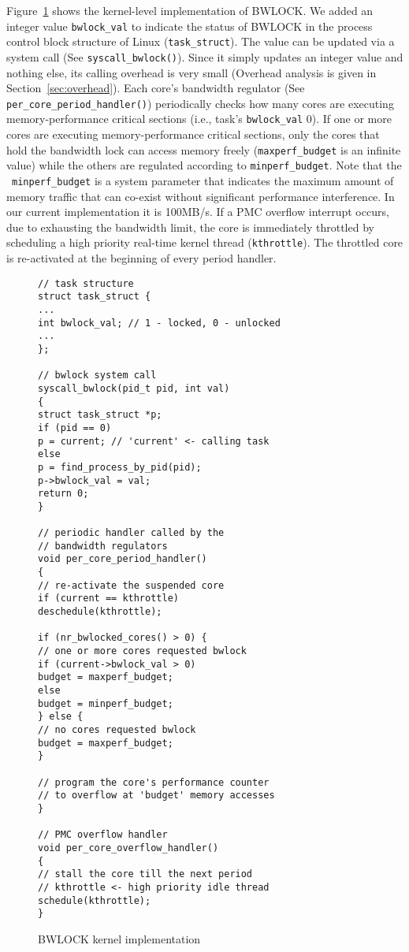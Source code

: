 \documentclass[times, 10pt,onecolumn]{article}
\begin{document}
Figure~\ref{fig:bwlock-kernel} shows the kernel-level implementation
of BWLOCK. We added an integer value \texttt{bwlock\_val} to indicate
the status of BWLOCK in the process control block structure of Linux
(\texttt{task\_struct}).
The value can be updated via a system
call (See \texttt{syscall\_bwlock()}). Since it simply updates an
integer value and nothing else, its calling overhead is very small
(Overhead analysis is given in Section~\ref{sec:overhead}).
Each core's bandwidth regulator (See \texttt{per\_core\_period\_handler()})
periodically checks how many cores are executing memory-performance
critical sections (i.e., task's \texttt{bwlock\_val}  0). If one or
more cores are executing memory-performance critical sections,
only the cores that hold the bandwidth lock can access memory freely
(\texttt{maxperf\_budget} is an infinite value) while the others are
regulated according to \texttt{minperf\_budget}. Note that the
~\texttt{minperf\_budget} is a system parameter that indicates the
maximum amount of memory traffic that can co-exist without significant
performance interference. In our current implementation it is 100MB/s.
If a PMC overflow interrupt occurs, due to exhausting the bandwidth
limit, the core is immediately throttled
by scheduling a high priority real-time kernel thread
(\texttt{kthrottle}). The throttled core is re-activated at the
beginning of every period handler.

\begin{figure}
\begin{lstlisting}
// task structure
struct task_struct {
...
int bwlock_val; // 1 - locked, 0 - unlocked
...
};

// bwlock system call
syscall_bwlock(pid_t pid, int val)
{
struct task_struct *p;
if (pid == 0)
p = current; // 'current' <- calling task
else
p = find_process_by_pid(pid);
p->bwlock_val = val;
return 0;
}

// periodic handler called by the
// bandwidth regulators
void per_core_period_handler()
{
// re-activate the suspended core
if (current == kthrottle)
deschedule(kthrottle);

if (nr_bwlocked_cores() > 0) {
// one or more cores requested bwlock
if (current->bwlock_val > 0)
budget = maxperf_budget;
else
budget = minperf_budget;
} else {
// no cores requested bwlock
budget = maxperf_budget;
}

// program the core's performance counter
// to overflow at 'budget' memory accesses
}

// PMC overflow handler
void per_core_overflow_handler()
{
// stall the core till the next period
// kthrottle <- high priority idle thread
schedule(kthrottle);
}

\end{lstlisting}
\caption{BWLOCK kernel implementation}
\label{fig:bwlock-kernel}
\end{figure}
\end{document}
